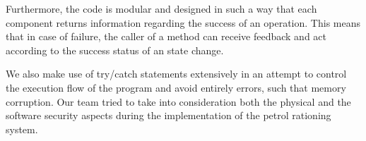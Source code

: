 \documentclass[a4paper,10pt]{llncs}
\begin{document}
Furthermore, the code is modular and designed in such a way that each component returns information regarding the success of an operation. This means that in case of failure, the caller of a method can receive feedback and act according to the success status of an state change.

We also make use of try/catch statements extensively in an attempt to control the execution flow of the program and avoid entirely errors, such that memory corruption. Our team tried to take into consideration both the physical and the software security aspects during the implementation of the petrol rationing system.


\end{document}
